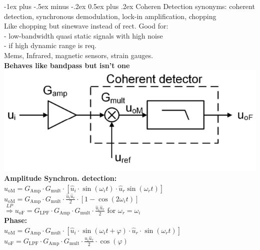 \documentclass[5pt,landscape]{article}
\makeatletter
\renewcommand{\section}{\@startsection{section}{1}{0mm}%
                                {-1ex plus -.5ex minus -.2ex}%
                                {0.5ex plus .2ex}%
                                {\normalfont\large\bfseries}}
\makeatother
\begin{document}
\begin{multicols*}{5}
\section{Coheren Detection}
synonyms: coherent detection, synchronous demodulation, lock-in amplification, chopping\\
Like chopping but sinewave instead of rect.
Good for:\\
- low-bandwidth quasi static signals with high noise\\
- if high dynamic range is req.\\
Mems, Infrared, magnetic sensors, strain gauges. \\
\textbf{Behaves like bandpass but isn't one}\\
\includegraphics[width=\columnwidth]{images/coherent_setup.png}\\
\textbf{Amplitude Synchron. detection:}\\
$ u_{\mathrm{oM}}=G_{\mathrm{Amp}} \cdot G_{\mathrm{mult}} \cdot\left[\hat{u}_{i} \cdot \sin \left(\omega_{i} t\right) \cdot \hat{u}_{r} \sin \left(\omega_{r} t\right)\right] $\\
$ u_{\mathrm{oM}}=G_{\mathrm{Amp}} \cdot G_{\mathrm{mult}} \cdot \frac{\widehat{u}_{i} \widehat{u}_{r}}{2} \cdot\left[1-\cos \left(2 \omega_{i} t\right)\right] $\\
$ \overset{LP}{\Rightarrow} u_{\mathrm{oF}}=G_{\mathrm{LPF}} \cdot G_{\mathrm{Amp}} \cdot G_{\mathrm{mult}} \cdot \frac{\hat{u}_{i} \hat{u}_{r}}{2} $
for $ \omega_r = \omega_i $\\
\textbf{Phase:}\\
$ u_{\mathrm{oM}}=G_{\mathrm{Amp}} \cdot G_{\mathrm{mult}} \cdot\left[\hat{u}_{i} \cdot \sin \left(\omega_{i} t+\varphi\right) \cdot \hat{u}_{r} \cdot \sin \left(\omega_{r} t\right)\right] $\\
$ u_{\mathrm{oF}}=G_{\mathrm{LPF}} \cdot G_{\mathrm{Amp}} \cdot G_{\mathrm{mult}} \cdot \frac{\widehat{u}_{i} \widehat{u}_{r}}{2} \cdot \cos (\varphi) $\\

\end{multicols*}
\end{document}
